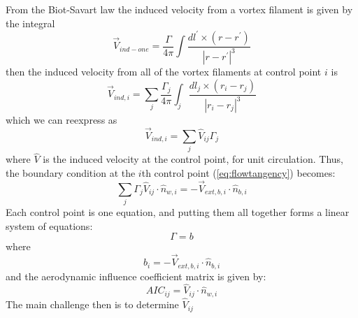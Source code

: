 \documentclass{article}
\begin{document}
From the Biot-Savart law the induced velocity from a vortex filament is given by the integral
\begin{equation}
    \vec{V}_{ind-one} = \frac{\Gamma}{4\pi}\int \frac{dl^\prime \times (r - r^\prime)}{|r - r^\prime|^3}
\end{equation}
then the induced velocity from all of the vortex filaments at control point $i$ is
\begin{equation}
    \vec{V}_{ind, i} = \sum_j \frac{\Gamma_j}{4\pi}\int_j \frac{dl_j \times (r_i - r_j)}{|r_i - r_j|^3}
\end{equation}
which we can reexpress as
\begin{equation}
    \vec{V}_{ind, i} = \sum_j \hat{V}_{ij} \Gamma_j
\end{equation}
where $\hat{V}$ is the induced velocity at the control point, for unit circulation.  Thus, the boundary condition at the $i$th control point (\cref{eq:flowtangency}) becomes:
\begin{equation}
\sum_j \Gamma_j \hat{V}_{ij} \cdot \hat{n}_{w,i} = - \vec V_{ext,b,i} \cdot \hat{n}_{b,i}
\end{equation}
Each control point is one equation, and putting them all together forms a linear system of equations:
\begin{equation}
[AIC] \Gamma = b 
\end{equation}
where 
\begin{equation}
b_i = - \vec V_{ext, b, i} \cdot \hat{n}_{b, i}
\end{equation}
and the aerodynamic influence coefficient matrix is given by:
\begin{equation}
AIC_{ij} = \hat{V}_{ij} \cdot \hat{n}_{w,i}
\end{equation}
The main challenge then is to determine $\hat{V}_{ij}$
\end{document}
